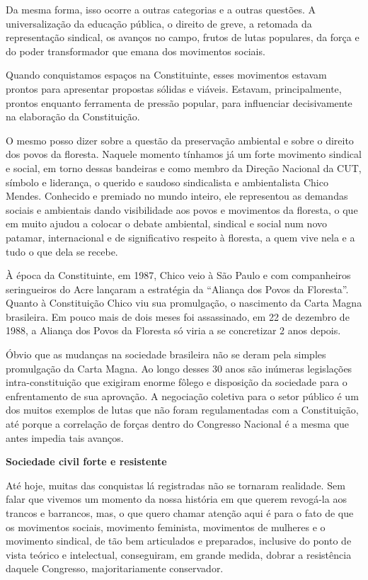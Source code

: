 Da mesma forma, isso ocorre a outras categorias e a outras questões. A
universalização da educação pública, o direito de greve, a retomada da
representação sindical, os avanços no campo, frutos de lutas populares,
da força e do poder transformador que emana dos movimentos sociais.

Quando conquistamos espaços na Constituinte, esses movimentos estavam
prontos para apresentar propostas sólidas e viáveis. Estavam,
principalmente, prontos enquanto ferramenta de pressão popular, para
influenciar decisivamente na elaboração da Constituição.

O mesmo posso dizer sobre a questão da preservação ambiental e sobre o
direito dos povos da floresta. Naquele momento tínhamos já um forte
movimento sindical e social, em torno dessas bandeiras e como membro da
Direção Nacional da CUT, símbolo e liderança, o querido e saudoso
sindicalista e ambientalista Chico Mendes. Conhecido e premiado no mundo
inteiro, ele representou as demandas sociais e ambientais dando
visibilidade aos povos e movimentos da floresta, o que em muito ajudou a
colocar o debate ambiental, sindical e social num novo patamar,
internacional e de significativo respeito à floresta, a quem vive nela e
a tudo o que dela se recebe.

À época da Constituinte, em 1987, Chico veio à São Paulo e com
companheiros seringueiros do Acre lançaram a estratégia da ``Aliança dos
Povos da Floresta''. Quanto à Constituição Chico viu sua promulgação, o
nascimento da Carta Magna brasileira. Em pouco mais de dois meses foi
assassinado, em 22 de dezembro de 1988, a Aliança dos Povos da Floresta
só viria a se concretizar 2 anos depois.

Óbvio que as mudanças na sociedade brasileira não se deram pela simples
promulgação da Carta Magna. Ao longo desses 30 anos são inúmeras
legislações intra-constituição que exigiram enorme fôlego e disposição
da sociedade para o enfrentamento de sua aprovação. A negociação
coletiva para o setor público é um dos muitos exemplos de lutas que não
foram regulamentadas com a Constituição, até porque a correlação de
forças dentro do Congresso Nacional é a mesma que antes impedia tais
avanços.

\textbf{Sociedade civil forte e resistente}

Até hoje, muitas das conquistas lá registradas não se tornaram
realidade. Sem falar que vivemos um momento da nossa história em que
querem revogá-la aos trancos e barrancos, mas, o que quero chamar
atenção aqui é para o fato de que os movimentos sociais, movimento
feminista, movimentos de mulheres e o movimento sindical, de tão bem
articulados e preparados, inclusive do ponto de vista teórico e
intelectual, conseguiram, em grande medida, dobrar a resistência daquele
Congresso, majoritariamente conservador.

